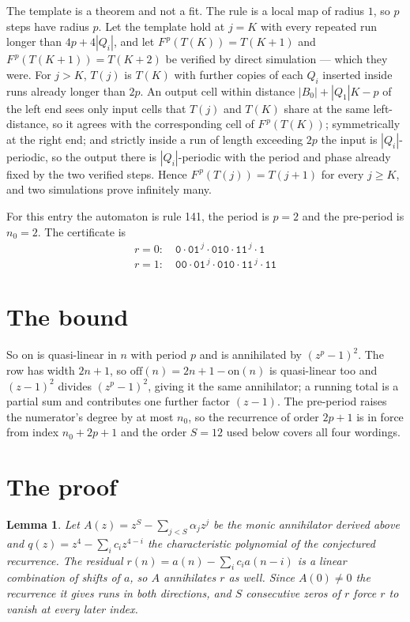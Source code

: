 \documentclass[11pt,a4paper]{article}
\theoremstyle{plain}
\newtheorem{lemma}[theorem]{Lemma}
\theoremstyle{definition}
\begin{document}
The template is a theorem and not a fit. The rule is a local map of radius $1$, so $p$ steps
have radius $p$. Let the template hold at $j=K$ with every repeated run longer than
$4p+4|Q_i|$, and let $F^{\,p}(T(K))=T(K+1)$ and $F^{\,p}(T(K+1))=T(K+2)$ be verified by direct
simulation --- which they were. For $j>K$, $T(j)$ is $T(K)$ with further copies of each $Q_i$
inserted inside runs already longer than $2p$. An output cell within distance
$|B_0|+|Q_1|K-p$ of the left end sees only input cells that $T(j)$ and $T(K)$ share at the same
left-distance, so it agrees with the corresponding cell of $F^{\,p}(T(K))$; symmetrically at
the right end; and strictly inside a run of length exceeding $2p$ the input is
$|Q_i|$-periodic, so the output there is $|Q_i|$-periodic with the period and phase already
fixed by the two verified steps. Hence $F^{\,p}(T(j))=T(j+1)$ for every $j\ge K$, and two
simulations prove infinitely many.

For this entry the automaton is rule 141, the period is $p=2$ and the pre-period is $n_0=2$.
The certificate is
\begin{gather*}
r=0:\quad \texttt{0} \cdot \texttt{01}^{\,j} \cdot \texttt{010} \cdot \texttt{11}^{\,j} \cdot \texttt{1} \\
r=1:\quad \texttt{00} \cdot \texttt{01}^{\,j} \cdot \texttt{010} \cdot \texttt{11}^{\,j} \cdot \texttt{11}
\end{gather*}

\section{The bound}

So $\mathrm{on}$ is quasi-linear in $n$ with period $p$ and is annihilated by
$(z^p-1)^2$. The row has width $2n+1$, so $\mathrm{off}(n)=2n+1-\mathrm{on}(n)$ is quasi-linear
too and $(z-1)^2$ divides $(z^p-1)^2$, giving it the same annihilator; a running total is a
partial sum and contributes one further factor $(z-1)$. The pre-period raises the numerator's
degree by at most $n_0$, so the recurrence of order $2p+1$ is in force from index $n_0+2p+1$
and the order $S=12$ used below covers all four wordings.

\section{The proof}

\begin{lemma}\label{lem:crit}
Let $A(z)=z^S-\sum_{j<S}\alpha_jz^{j}$ be the monic annihilator derived above and
$q(z)=z^{4}-\sum_ic_iz^{4-i}$ the characteristic polynomial of the conjectured
recurrence. The residual $r(n)=a(n)-\sum_ic_ia(n-i)$ is a linear combination of shifts of $a$,
so $A$ annihilates $r$ as well. Since $A(0)\ne0$ the recurrence it gives runs in both
directions, and $S$ consecutive zeros of $r$ force $r$ to vanish at every later index.
\end{lemma}
\end{document}
